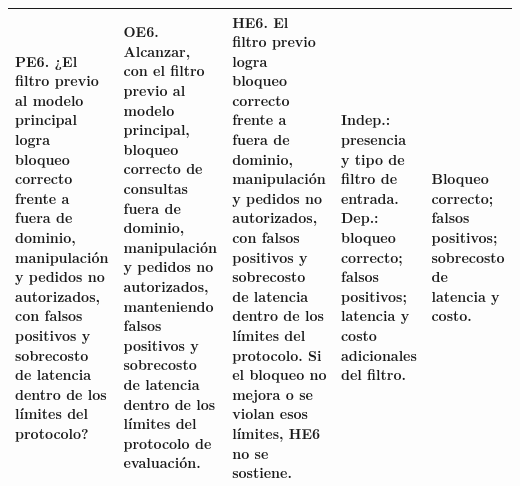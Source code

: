 \documentclass[10pt,a4paper,landscape]{article}
\begin{document}
{\begin{tabularx}{\linewidth}{|Y|Y|Y|Y|Y|}
\hline
\textbf{PE6.} ¿El filtro previo al modelo principal logra bloqueo correcto frente a fuera de dominio, manipulación y pedidos no autorizados, con falsos positivos y sobrecosto de latencia dentro de los límites del protocolo? &
\textbf{OE6.} Alcanzar, con el filtro previo al modelo principal, bloqueo correcto de consultas fuera de dominio, manipulación y pedidos no autorizados, manteniendo falsos positivos y sobrecosto de latencia dentro de los límites del protocolo de evaluación. &
\textbf{HE6.} El filtro previo logra bloqueo correcto frente a fuera de dominio, manipulación y pedidos no autorizados, con falsos positivos y sobrecosto de latencia dentro de los límites del protocolo. Si el bloqueo no mejora o se violan esos límites, HE6 no se sostiene. &
\textbf{Indep.:} presencia y tipo de filtro de entrada. \textbf{Dep.:} bloqueo correcto; falsos positivos; latencia y costo adicionales del filtro. &
Bloqueo correcto; falsos positivos; sobrecosto de latencia y costo. \\
\hline
\end{tabularx}
}
\end{document}
